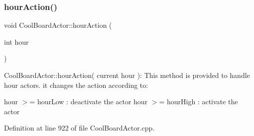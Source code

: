 \subsubsection{\texorpdfstring{hour\+Action()}{hourAction()}}
{\footnotesize\ttfamily void Cool\+Board\+Actor\+::hour\+Action (\begin{DoxyParamCaption}\item[{int}]{hour }\end{DoxyParamCaption})}

Cool\+Board\+Actor\+::hour\+Action( current hour )\+: This method is provided to handle hour actors. it changes the action according to\+:

hour $>$= hour\+Low \+: deactivate the actor hour $>$= hour\+High \+: activate the actor 

Definition at line 922 of file Cool\+Board\+Actor.\+cpp.


